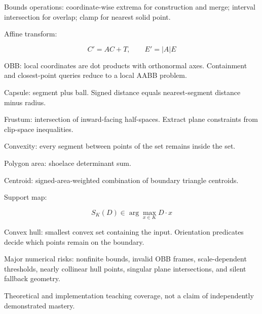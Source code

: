 Bounds operations: coordinate-wise extrema for construction and merge; interval intersection for overlap; clamp for nearest solid point.

Affine transform:

\[
\boxed{C'=AC+T,\qquad E'=|A|E}
\]

OBB: local coordinates are dot products with orthonormal axes. Containment and closest-point queries reduce to a local AABB problem.

Capsule: segment plus ball. Signed distance equals nearest-segment distance minus radius.

Frustum: intersection of inward-facing half-spaces. Extract plane constraints from clip-space inequalities.

Convexity: every segment between points of the set remains inside the set.

Polygon area: shoelace determinant sum.

Centroid: signed-area-weighted combination of boundary triangle centroids.

Support map:

\[
\boxed{S_K(D)\in\arg\max_{x\in K}D\cdot x}
\]

Convex hull: smallest convex set containing the input. Orientation predicates decide which points remain on the boundary.

Major numerical risks: nonfinite bounds, invalid OBB frames, scale-dependent thresholds, nearly collinear hull points, singular plane intersections, and silent fallback geometry.

Theoretical and implementation teaching coverage, not a claim of independently demonstrated mastery.

